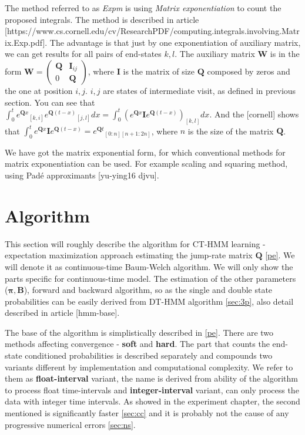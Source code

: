 \documentclass[thesis=M,english]{FITthesis}[2012/10/20]
\newcommand{\matr}[1]{\mathbf{#1}}
\begin{document}
The method referred to as \textit{Expm} is using \textit{Matrix exponentiation} to count the proposed integrals. The method is described in article [https://www.cs.cornell.edu/cv/ResearchPDF/computing.integrals.involving.Matrix.Exp.pdf]. The advantage is that just by one exponentiation of auxiliary matrix, we can get results for all pairs of end-states $k,l$. The auxiliary matrix $\matr{W}$ is in the form $\matr{W} =  \begin{pmatrix} \matr{Q} & \matr{I}_{ij} \\ 0 & \matr{Q} \end{pmatrix} $, where $\matr{I}$ is the matrix of size $\matr{Q}$ composed by zeros and the one at position $i,j$. $i,j$ are states of intermediate visit, as defined in previous section. You can see that $ \int_{0}^{t} {e^{\matr{Q}x}}_{[k,i]} {e^{\matr{Q}(t-x)}}_{[j,l]} dx  =  \int_{0}^{t} ( e^{\matr{Q}x} \matr{I} e^{\matr{Q}(t-x)} )_{[k,l]} dx $. And the [cornell] shows that $\int_{0}^{t}  e^{\matr{Q}x} \matr{I} e^{\matr{Q}(t-x)} = {e^{\matr{Q}t}}_{[0:n][n+1:2n]}$, where $n$ is the size of the matrix $\matr{Q}$.

We have got the matrix exponential form, for which conventional methods for matrix exponentiation can be used. For example scaling and squaring method, using Pad\'{e} approximants [yu-ying16 djvu].      


\section{Algorithm}

This section will roughly describe the algorithm for CT-HMM learning - expectation maximization approach estimating the jump-rate matrix $\matr{Q}$ \ref{pe}. We will denote it as continuous-time Baum-Welch algorithm. We will only show the parts specific for continuous-time model. The estimation of the other parameters ($\matr{\pi},\matr{B}$), forward and backward algorithm, so as the single and double state probabilities can be easily derived from DT-HMM algorithm \ref{sec:3p}, also detail described in article [hmm-base].

The base of the algorithm is simplistically described in \ref{pe}. There are two methods affecting convergence - \textbf{soft} and \textbf{hard}. The part that counts the end-state conditioned probabilities is described separately and compounds two variants different by implementation and computational complexity. We refer to them as \textbf{float-interval} variant, the name is derived from ability of the algorithm to process float time-intervals and \textbf{integer-interval} variant, can only process the data with integer time intervals. As showed in the experiment chapter, the second mentioned is significantly faster \ref{sec:cc} and it is probably not the cause of any progressive numerical errors \ref{sec:ns}.   
\end{document}
